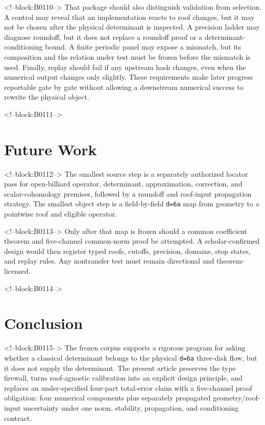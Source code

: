\documentclass[11pt,a4paper]{article}
\begin{document}
<!--block:B0110-->
That package should also distinguish validation from selection. A control may reveal that an implementation reacts to roof changes, but it may not be chosen after the physical determinant is inspected. A precision ladder may diagnose roundoff, but it does not replace a roundoff proof or a determinant-conditioning bound. A finite periodic panel may expose a mismatch, but its composition and the relation under test must be frozen before the mismatch is used. Finally, replay should fail if any upstream hash changes, even when the numerical output changes only slightly. These requirements make later progress reportable gate by gate without allowing a downstream numerical success to rewrite the physical object.

<!--block:B0111-->
\section{Future Work}

<!--block:B0112-->
The smallest source step is a separately authorized locator pass for open-billiard operator, determinant, approximation, correction, and scalar-cohomology premises, followed by a roundoff and roof-input propagation strategy. The smallest object step is a field-by-field \texttt{d=6a} map from geometry to a pointwise roof and eligible operator.

<!--block:B0113-->
Only after that map is frozen should a common coefficient theorem and five-channel common-norm proof be attempted. A scholar-confirmed design would then register typed roofs, cutoffs, precision, domains, stop states, and replay rules. Any nontransfer test must remain directional and theorem-licensed.

<!--block:B0114-->
\section{Conclusion}

<!--block:B0115-->
The frozen corpus supports a rigorous program for asking whether a classical determinant belongs to the physical \texttt{d=6a} three-disk flow, but it does not supply the determinant. The present article preserves the type firewall, turns roof-agnostic calibration into an explicit design principle, and replaces an under-specified four-part total-error claim with a five-channel proof obligation: four numerical components plus separately propagated geometry/roof-input uncertainty under one norm, stability, propagation, and conditioning contract.
\end{document}
